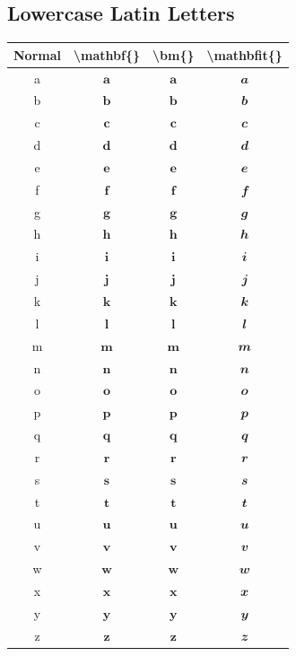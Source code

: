 \documentclass[12pt,a4paper]{article}
\begin{document}
\newpage

\subsection*{Lowercase Latin Letters}

\begin{longtable}{|c|c|c|c|}
\hline
\textbf{Normal} & \textbf{\textbackslash{}mathbf\{\}} & \textbf{\textbackslash{}bm\{\}} & \textbf{\textbackslash{}mathbfit\{\}} \\
\hline
a & $\mathbf{a}$ & $\bm{a}$ & $\mathbfit{a}$ \\ %
b & $\mathbf{b}$ & $\bm{b}$ & $\mathbfit{b}$ \\ %
c & $\mathbf{c}$ & $\bm{c}$ & $\mathbfit{c}$ \\ %
d & $\mathbf{d}$ & $\bm{d}$ & $\mathbfit{d}$ \\ %
e & $\mathbf{e}$ & $\bm{e}$ & $\mathbfit{e}$ \\ %
f & $\mathbf{f}$ & $\bm{f}$ & $\mathbfit{f}$ \\ %
g & $\mathbf{g}$ & $\bm{g}$ & $\mathbfit{g}$ \\ %
h & $\mathbf{h}$ & $\bm{h}$ & $\mathbfit{h}$ \\ %
i & $\mathbf{i}$ & $\bm{i}$ & $\mathbfit{i}$ \\ %
j & $\mathbf{j}$ & $\bm{j}$ & $\mathbfit{j}$ \\ %
k & $\mathbf{k}$ & $\bm{k}$ & $\mathbfit{k}$ \\ %
l & $\mathbf{l}$ & $\bm{l}$ & $\mathbfit{l}$ \\ %
m & $\mathbf{m}$ & $\bm{m}$ & $\mathbfit{m}$ \\ %
n & $\mathbf{n}$ & $\bm{n}$ & $\mathbfit{n}$ \\ %
o & $\mathbf{o}$ & $\bm{o}$ & $\mathbfit{o}$ \\ %
p & $\mathbf{p}$ & $\bm{p}$ & $\mathbfit{p}$ \\ %
q & $\mathbf{q}$ & $\bm{q}$ & $\mathbfit{q}$ \\ %
r & $\mathbf{r}$ & $\bm{r}$ & $\mathbfit{r}$ \\ %
s & $\mathbf{s}$ & $\bm{s}$ & $\mathbfit{s}$ \\ %
t & $\mathbf{t}$ & $\bm{t}$ & $\mathbfit{t}$ \\ %
u & $\mathbf{u}$ & $\bm{u}$ & $\mathbfit{u}$ \\ %
v & $\mathbf{v}$ & $\bm{v}$ & $\mathbfit{v}$ \\ %
w & $\mathbf{w}$ & $\bm{w}$ & $\mathbfit{w}$ \\ %
x & $\mathbf{x}$ & $\bm{x}$ & $\mathbfit{x}$ \\ %
y & $\mathbf{y}$ & $\bm{y}$ & $\mathbfit{y}$ \\ %
z & $\mathbf{z}$ & $\bm{z}$ & $\mathbfit{z}$ \\ %
\hline
\end{longtable}
\end{document}
